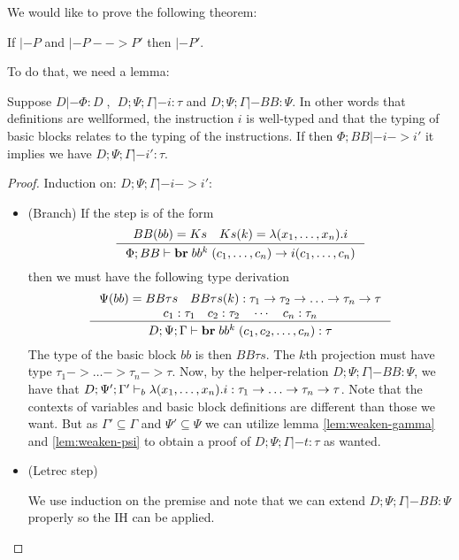 \documentclass[a4paper, oneside, 10pt, draft]{memoir}
\begin{document}
We would like to prove the following theorem:
\begin{thm}
  \label{thm:preservation}
  If $|- P$ and $|- P --> P'$ then $|- P'$.
\end{thm}
To do that, we need a lemma:
\begin{lem}
  \label{thm:preservation-i}
  Suppose $D |- \Phi : D \;$, $\; D;\Psi;\Gamma |- i : \tau$ and $D;\Psi;\Gamma
  |- BB : \Psi$. In other words that definitions are wellformed, the
  instruction $i$ is well-typed and that the typing of basic blocks
  relates to the typing of the instructions. If then $\Phi;BB |- i ->
  i'$ it implies we have $D;\Psi;\Gamma |- i' : \tau$.
\end{lem}
\begin{proof}
  Induction on: $D;\Psi;\Gamma |- i -> i'$:
  \begin{itemize}
  \item (Branch) If the step is of the form
    \begin{equation*}
    \inference{BB(bb) = Ks \quad Ks(k) = \lambda(x_1, \dotsc, x_n).i}{\Phi;BB |- \ibr{bb^k}{(c_1, \dotsc, c_n)} ->
      i(c_1, \dotsc, c_n)}
    \end{equation*}
    then we must have the following type derivation
    \begin{equation*}
    \inference{\Psi(bb) = BB\tau{}s \quad BB\tau{}s(k) : \tau_1 -> \tau_2 -> \dotsc ->
      \tau_n -> \tau\\
      c_1 : \tau_1 \quad c_2 : \tau_2 \quad \dotsb \quad c_n : \tau_n}
    {D;\Psi;\Gamma |- \ibr{bb^k}(c_1, c_2, \dotsc, c_n) : \tau}
    \end{equation*}
    The type of the basic block $bb$ is then $BB\tau{}s$. The $k$th
    projection must have type $\tau_1 -> \dotsc -> \tau_n ->
    \tau$. Now, by the helper-relation $D;\Psi;\Gamma |- BB : \Psi$,
    we have that $D;\Psi';\Gamma' |-_{b} \lambda(x_1, \dotsc, x_n).i :
    \tau_1 -> \dotsc -> \tau_n -> \tau$. Note that the contexts of
    variables and basic block definitions are different than those we
    want. But as $\Gamma' \subseteq \Gamma$ and $\Psi' \subseteq \Psi$
    we can utilize lemma \eqref{lem:weaken-gamma} and
    \eqref{lem:weaken-psi} to obtain a proof of $D;\Psi;\Gamma |- t :
    \tau$ as wanted.
    \item (Letrec step)
      \begin{rem}
        We use induction on the premise and note that we can extend
        $D;\Psi;\Gamma |- BB : \Psi$ properly so the IH can be
        applied.
      \end{rem}
  \end{itemize}
\end{proof}
\end{document}
